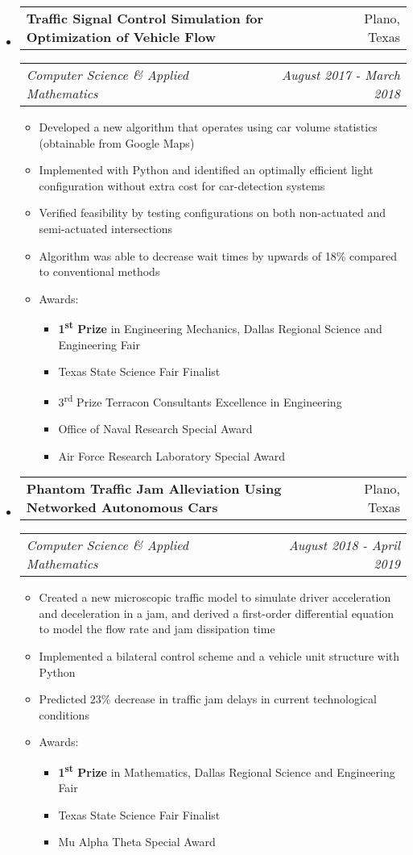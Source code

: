 \documentclass[letterpaper,11pt]{article}
\makeatletter
\newcommand{\resitem}[1]{\item #1 \vspace{-3pt}}
\newcommand{\ressubheading}[4]{
	\begin{tabular*}{7.0in}{l@{\extracolsep{\fill}}r}
			#1 & #2 \\
	\end{tabular*}
	\begin{tabular*}{7.0in}{l@{\extracolsep{\fill}}r}
			\textit{#3} & \textit{#4} \\
	\end{tabular*}\vspace{-6pt}}
\makeatother
\begin{document}
\begin{itemize}

\vspace{-3pt}

\item
	\ressubheading{\textbf{Traffic Signal Control Simulation for Optimization of Vehicle Flow}}{Plano, Texas}{Computer Science \& Applied Mathematics}{August 2017 - March 2018}
		\begin{itemize}
			\resitem{Developed a new algorithm that operates using car volume statistics (obtainable from Google Maps)} 
			\resitem{Implemented with Python and identified an optimally efficient light configuration without extra cost for car-detection systems}
			\resitem{Verified feasibility by testing configurations on both non-actuated and semi-actuated intersections}
			\resitem{Algorithm was able to decrease wait times by upwards of 18\% compared to conventional methods}
			\resitem{Awards:}
				\begin{itemize}
					\item[\textbullet] \textbf{1\textsuperscript{st} Prize} in Engineering Mechanics, Dallas Regional Science and Engineering Fair
					\item[\textbullet] Texas State Science Fair Finalist
					\item[\textbullet] 3\textsuperscript{rd} Prize Terracon Consultants Excellence in Engineering
					\item[\textbullet] Office of Naval Research Special Award
					\item[\textbullet] Air Force Research Laboratory Special Award
				\end{itemize}\vspace{-6pt}
		\end{itemize}
\item
	\ressubheading{\textbf{Phantom Traffic Jam Alleviation Using Networked Autonomous Cars}}{Plano, Texas}{Computer Science \& Applied Mathematics}{August 2018 - April 2019}
		\begin{itemize}
			\resitem{Created a new microscopic traffic model to simulate driver acceleration and deceleration in a jam, and derived a first-order differential equation to model the flow rate and jam dissipation time} 
			\resitem{Implemented a bilateral control scheme and a vehicle unit structure with Python}
			\resitem{Predicted 23\% decrease in traffic jam delays in current technological conditions}
			\resitem{Awards:}
				\begin{itemize}
					\item[\textbullet] \textbf{1\textsuperscript{st} Prize} in Mathematics, Dallas Regional Science and Engineering Fair
					\item[\textbullet] Texas State Science Fair Finalist
					\item[\textbullet] Mu Alpha Theta Special Award
				\end{itemize}\vspace{-6pt}
		\end{itemize}


\end{itemize}
\end{document}
